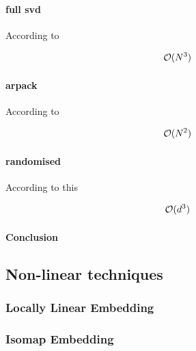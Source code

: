 \clearpage

\paragraph{full \gls{svd}}

According to \cite{wright2001large}

$$\mathcal{O}(N^3)$$

\clearpage

\paragraph{\gls{arpack}}

According to \cite{wright2001large}

$$\mathcal{O}(N^2)$$

\clearpage

\paragraph{randomised}

According to this \cite{HandsOnMLCh8}

$$\mathcal{O}(d^3)$$


\clearpage

\paragraph{Conclusion}

\clearpage

\subsection{Non-linear techniques}

\subsubsection{Locally Linear Embedding}
\subsubsection{Isomap Embedding}
